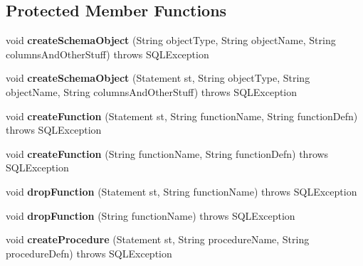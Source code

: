 \subsection*{Protected Member Functions}
\begin{DoxyCompactItemize}
\item 
\mbox{\label{classtestsuite_1_1_base_test_case_a43e16f16b388ad8133b17147588e6670}} 
void {\bfseries create\+Schema\+Object} (String object\+Type, String object\+Name, String columns\+And\+Other\+Stuff)  throws S\+Q\+L\+Exception 
\item 
\mbox{\label{classtestsuite_1_1_base_test_case_a7c9a8512d5ed0cfbe4b80a8f1b990b24}} 
void {\bfseries create\+Schema\+Object} (Statement st, String object\+Type, String object\+Name, String columns\+And\+Other\+Stuff)  throws S\+Q\+L\+Exception 
\item 
\mbox{\label{classtestsuite_1_1_base_test_case_ab964ad68ca60ae9fef1deeef48b25c79}} 
void {\bfseries create\+Function} (Statement st, String function\+Name, String function\+Defn)  throws S\+Q\+L\+Exception 
\item 
\mbox{\label{classtestsuite_1_1_base_test_case_a308f048150ff4bde942c42021b9b2a09}} 
void {\bfseries create\+Function} (String function\+Name, String function\+Defn)  throws S\+Q\+L\+Exception 
\item 
\mbox{\label{classtestsuite_1_1_base_test_case_ae40d8d8c945d750bd064ea265a1c48f3}} 
void {\bfseries drop\+Function} (Statement st, String function\+Name)  throws S\+Q\+L\+Exception 
\item 
\mbox{\label{classtestsuite_1_1_base_test_case_a361ab79861482404c0eb3c637fbf92e2}} 
void {\bfseries drop\+Function} (String function\+Name)  throws S\+Q\+L\+Exception 
\item 
\mbox{\label{classtestsuite_1_1_base_test_case_a255cff56778ce81df619a9fb50a36696}} 
void {\bfseries create\+Procedure} (Statement st, String procedure\+Name, String procedure\+Defn)  throws S\+Q\+L\+Exception 
\item 

\end{DoxyCompactItemize}

